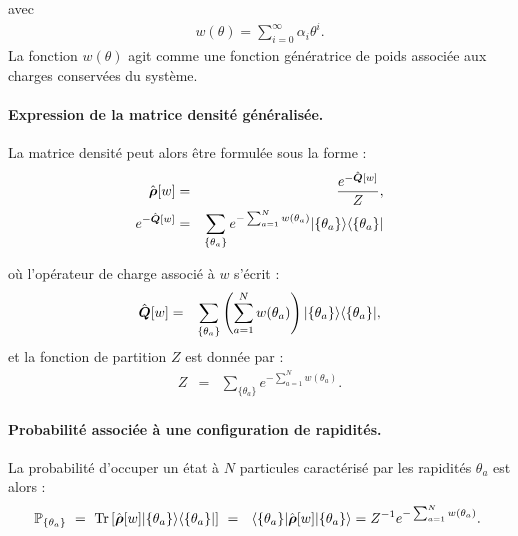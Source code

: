 avec 
\begin{eqnarray}
	w(\theta) = \sum_{i=0}^\infty \alpha_i \theta^i.	
\end{eqnarray}
La fonction $w(\theta)$ agit comme une fonction génératrice de poids associée aux charges conservées du système.

\paragraph{Expression de la matrice densité généralisée.}
La matrice densité peut alors être formulée sous la forme :	
\begin{eqnarray}
	\hat{\bm{\rho}}[w] & = & \frac{e^{-\hat{\bm{Q}}[w]}}{Z}, \\
	e^{-\hat{\bm{Q}}[w]} & = & 	\sum_{\{\theta_a \}} e^{- \sum_{a = 1}^N w(\theta_a) } \vert \{ \theta_a\} \rangle \langle  \{ \theta_a\}  \vert 
\end{eqnarray}
 
	
où l'opérateur de charge associé à $w$ s’écrit :
\begin{eqnarray}
	\hat{\bm{Q}} [w]   & = &  \sum_{\{\theta_a \}} \left ( \sum_{a = 1}^N w ( \theta_a )  \right ) \vert \{ \theta_a \} \rangle \langle \{ \theta_a \} \vert,	
\end{eqnarray}
et la fonction de partition $Z$ est donnée par :
\begin{eqnarray}
	Z  & = & \sum_{\{\theta_a \}} e^{-\sum_{a = 1}^N w(\theta_a)}.		
\end{eqnarray}

\paragraph{Probabilité associée à une configuration de rapidités.}

La probabilité d’occuper un état à $N$ particules caractérisé par les rapidités ${\theta_a}$ est alors :
\begin{eqnarray}
	\mathbb{P}_{\{ \theta_a \}} ~=~ \mathrm{Tr} \left [\operator{\rho}[w] \vert \{ \theta_a \} \rangle \langle \{ \theta_a \} \vert  \right ] ~= ~ \langle \{ \theta_a \}\vert \operator{\rho}[w] \vert  \{ \theta_a \} \rangle = Z^{-1}e^{-\sum_{a = 1}^N w(\theta_a)}. 		
\end{eqnarray}

